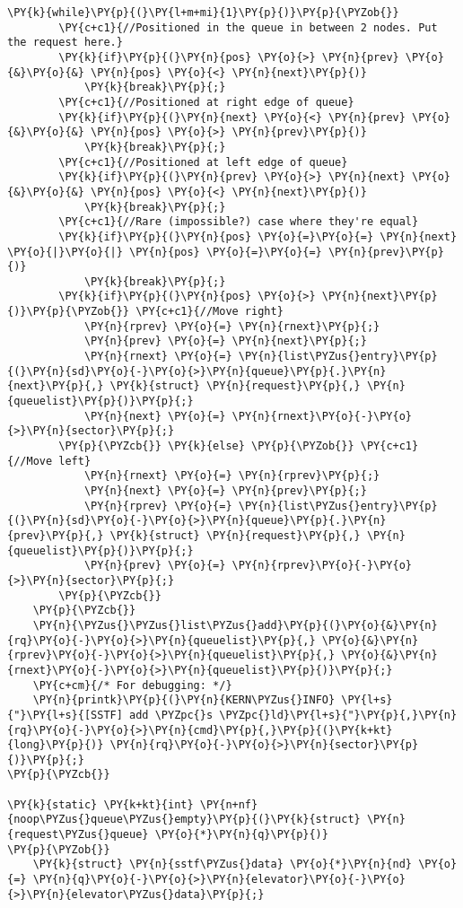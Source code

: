 \begin{Verbatim}[commandchars=\\\{\}]
	\PY{k}{while}\PY{p}{(}\PY{l+m+mi}{1}\PY{p}{)}\PY{p}{\PYZob{}}
		\PY{c+c1}{//Positioned in the queue in between 2 nodes. Put the request here.}
		\PY{k}{if}\PY{p}{(}\PY{n}{pos} \PY{o}{>} \PY{n}{prev} \PY{o}{&}\PY{o}{&} \PY{n}{pos} \PY{o}{<} \PY{n}{next}\PY{p}{)}
			\PY{k}{break}\PY{p}{;}
		\PY{c+c1}{//Positioned at right edge of queue}
		\PY{k}{if}\PY{p}{(}\PY{n}{next} \PY{o}{<} \PY{n}{prev} \PY{o}{&}\PY{o}{&} \PY{n}{pos} \PY{o}{>} \PY{n}{prev}\PY{p}{)}
			\PY{k}{break}\PY{p}{;}
		\PY{c+c1}{//Positioned at left edge of queue}
		\PY{k}{if}\PY{p}{(}\PY{n}{prev} \PY{o}{>} \PY{n}{next} \PY{o}{&}\PY{o}{&} \PY{n}{pos} \PY{o}{<} \PY{n}{next}\PY{p}{)}
			\PY{k}{break}\PY{p}{;}
		\PY{c+c1}{//Rare (impossible?) case where they're equal}
		\PY{k}{if}\PY{p}{(}\PY{n}{pos} \PY{o}{=}\PY{o}{=} \PY{n}{next} \PY{o}{|}\PY{o}{|} \PY{n}{pos} \PY{o}{=}\PY{o}{=} \PY{n}{prev}\PY{p}{)}
			\PY{k}{break}\PY{p}{;}
		\PY{k}{if}\PY{p}{(}\PY{n}{pos} \PY{o}{>} \PY{n}{next}\PY{p}{)}\PY{p}{\PYZob{}} \PY{c+c1}{//Move right}
			\PY{n}{rprev} \PY{o}{=} \PY{n}{rnext}\PY{p}{;}
			\PY{n}{prev} \PY{o}{=} \PY{n}{next}\PY{p}{;} 
			\PY{n}{rnext} \PY{o}{=} \PY{n}{list\PYZus{}entry}\PY{p}{(}\PY{n}{sd}\PY{o}{-}\PY{o}{>}\PY{n}{queue}\PY{p}{.}\PY{n}{next}\PY{p}{,} \PY{k}{struct} \PY{n}{request}\PY{p}{,} \PY{n}{queuelist}\PY{p}{)}\PY{p}{;}
			\PY{n}{next} \PY{o}{=} \PY{n}{rnext}\PY{o}{-}\PY{o}{>}\PY{n}{sector}\PY{p}{;}
		\PY{p}{\PYZcb{}} \PY{k}{else} \PY{p}{\PYZob{}} \PY{c+c1}{//Move left}
			\PY{n}{rnext} \PY{o}{=} \PY{n}{rprev}\PY{p}{;}
			\PY{n}{next} \PY{o}{=} \PY{n}{prev}\PY{p}{;}
			\PY{n}{rprev} \PY{o}{=} \PY{n}{list\PYZus{}entry}\PY{p}{(}\PY{n}{sd}\PY{o}{-}\PY{o}{>}\PY{n}{queue}\PY{p}{.}\PY{n}{prev}\PY{p}{,} \PY{k}{struct} \PY{n}{request}\PY{p}{,} \PY{n}{queuelist}\PY{p}{)}\PY{p}{;}
			\PY{n}{prev} \PY{o}{=} \PY{n}{rprev}\PY{o}{-}\PY{o}{>}\PY{n}{sector}\PY{p}{;}
		\PY{p}{\PYZcb{}}
	\PY{p}{\PYZcb{}}
	\PY{n}{\PYZus{}\PYZus{}list\PYZus{}add}\PY{p}{(}\PY{o}{&}\PY{n}{rq}\PY{o}{-}\PY{o}{>}\PY{n}{queuelist}\PY{p}{,} \PY{o}{&}\PY{n}{rprev}\PY{o}{-}\PY{o}{>}\PY{n}{queuelist}\PY{p}{,} \PY{o}{&}\PY{n}{rnext}\PY{o}{-}\PY{o}{>}\PY{n}{queuelist}\PY{p}{)}\PY{p}{;}
	\PY{c+cm}{/* For debugging: */}
	\PY{n}{printk}\PY{p}{(}\PY{n}{KERN\PYZus{}INFO} \PY{l+s}{"}\PY{l+s}{[SSTF] add \PYZpc{}s \PYZpc{}ld}\PY{l+s}{"}\PY{p}{,}\PY{n}{rq}\PY{o}{-}\PY{o}{>}\PY{n}{cmd}\PY{p}{,}\PY{p}{(}\PY{k+kt}{long}\PY{p}{)} \PY{n}{rq}\PY{o}{-}\PY{o}{>}\PY{n}{sector}\PY{p}{)}\PY{p}{;}
\PY{p}{\PYZcb{}}

\PY{k}{static} \PY{k+kt}{int} \PY{n+nf}{noop\PYZus{}queue\PYZus{}empty}\PY{p}{(}\PY{k}{struct} \PY{n}{request\PYZus{}queue} \PY{o}{*}\PY{n}{q}\PY{p}{)}
\PY{p}{\PYZob{}}
	\PY{k}{struct} \PY{n}{sstf\PYZus{}data} \PY{o}{*}\PY{n}{nd} \PY{o}{=} \PY{n}{q}\PY{o}{-}\PY{o}{>}\PY{n}{elevator}\PY{o}{-}\PY{o}{>}\PY{n}{elevator\PYZus{}data}\PY{p}{;}


\end{Verbatim}
